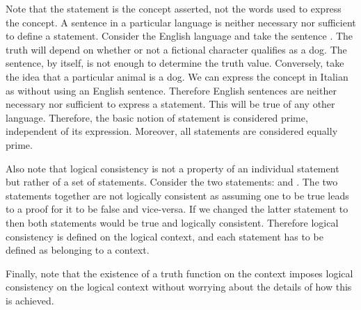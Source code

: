 \begin{mathSection}
\begin{justification}
		Note that the statement is the concept asserted, not the words used to express the concept. A sentence in a particular language is neither necessary nor sufficient to define a statement. Consider the English language and take the sentence . The truth will depend on whether or not a fictional character qualifies as a dog. The sentence, by itself, is not enough to determine the truth value. Conversely, take the idea that a particular animal is a dog. We can express the concept in Italian as  without using an English sentence. Therefore English sentences are neither necessary nor sufficient to express a statement. This will be true of any other language. Therefore, the basic notion of statement is considered prime, 
		independent of its expression. Moreover, all statements are considered equally prime.
		
		Also note that logical consistency is not a property of an individual statement but rather of a set of statements. Consider the two statements:  and . The two statements together are not logically consistent as assuming one to be true leads to a proof for it to be false and vice-versa. If we changed the latter statement to  then both statements would be true and logically consistent. Therefore logical consistency is defined on the logical context, and each statement has to be defined as belonging to a context.
		
		Finally, note that the existence of a truth function on the context imposes logical consistency on the logical context without worrying about the details of how this is achieved.
		
	\end{justification}
	
\end{mathSection}

